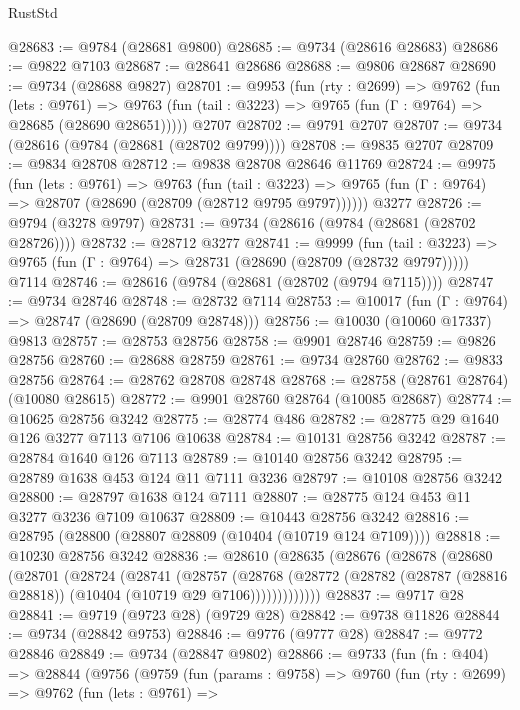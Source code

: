 \begin{lexlean}{RustStd}
\begin{coremodule}
@28683 := @9784 (@28681 @9800)
@28685 := @9734 (@28616 @28683)
@28686 := @9822 @7103
@28687 := @28641 @28686
@28688 := @9806 @28687
@28690 := @9734 (@28688 @9827)
@28701 := @9953
    (fun (rty : @2699) =>
    @9762
      (fun (lets : @9761) =>
      @9763 (fun (tail : @3223) => @9765 (fun (Γ : @9764) => @28685 (@28690 @28651)))))
    @2707
@28702 := @9791 @2707
@28707 := @9734 (@28616 (@9784 (@28681 (@28702 @9799))))
@28708 := @9835 @2707
@28709 := @9834 @28708
@28712 := @9838 @28708 @28646 @11769
@28724 := @9975
    (fun (lets : @9761) =>
    @9763
      (fun (tail : @3223) =>
      @9765 (fun (Γ : @9764) => @28707 (@28690 (@28709 (@28712 @9795 @9797))))))
    @3277
@28726 := @9794 (@3278 @9797)
@28731 := @9734 (@28616 (@9784 (@28681 (@28702 @28726))))
@28732 := @28712 @3277
@28741 := @9999
    (fun (tail : @3223) => @9765 (fun (Γ : @9764) => @28731 (@28690 (@28709 (@28732 @9797)))))
    @7114
@28746 := @28616 (@9784 (@28681 (@28702 (@9794 @7115))))
@28747 := @9734 @28746
@28748 := @28732 @7114
@28753 := @10017 (fun (Γ : @9764) => @28747 (@28690 (@28709 @28748)))
@28756 := @10030 (@10060 @17337) @9813
@28757 := @28753 @28756
@28758 := @9901 @28746
@28759 := @9826 @28756
@28760 := @28688 @28759
@28761 := @9734 @28760
@28762 := @9833 @28756
@28764 := @28762 @28708 @28748
@28768 := @28758 (@28761 @28764) (@10080 @28615)
@28772 := @9901 @28760 @28764 (@10085 @28687)
@28774 := @10625 @28756 @3242
@28775 := @28774 @486
@28782 := @28775 @29 @1640 @126 @3277 @7113 @7106 @10638
@28784 := @10131 @28756 @3242
@28787 := @28784 @1640 @126 @7113
@28789 := @10140 @28756 @3242
@28795 := @28789 @1638 @453 @124 @11 @7111 @3236
@28797 := @10108 @28756 @3242
@28800 := @28797 @1638 @124 @7111
@28807 := @28775 @124 @453 @11 @3277 @3236 @7109 @10637
@28809 := @10443 @28756 @3242
@28816 := @28795 (@28800 (@28807 @28809 (@10404 (@10719 @124 @7109))))
@28818 := @10230 @28756 @3242
@28836 := @28610
    (@28635
      (@28676
        (@28678
          (@28680
            (@28701
              (@28724
                (@28741
                  (@28757
                    (@28768
                      (@28772
                        (@28782 (@28787 (@28816 @28818)) (@10404 (@10719 @29 @7106)))))))))))))
@28837 := @9717 @28
@28841 := @9719 (@9723 @28) (@9729 @28)
@28842 := @9738 @11826
@28844 := @9734 (@28842 @9753)
@28846 := @9776 (@9777 @28)
@28847 := @9772 @28846
@28849 := @9734 (@28847 @9802)
@28866 := @9733
    (fun (fn : @404) =>
    @28844
      (@9756
        (@9759
          (fun (params : @9758) =>
          @9760
            (fun (rty : @2699) =>
            @9762
              (fun (lets : @9761) =>

\end{coremodule}
\end{lexlean}
